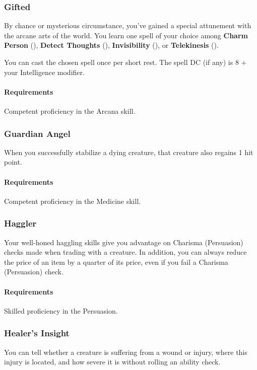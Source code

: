 \subsubsection{Gifted} \label{feat::gifted}
    By chance or mysterious circumstance, you've gained a special attunement with the arcane arts of the world.
    You learn one spell of your choice among \textbf{Charm Person} (\pageref{spell::charmperson}), \textbf{Detect Thoughts} (\pageref{spell::detectthoughts}), \textbf{Invisibility} (\pageref{spell::invisibility}), or \textbf{Telekinesis} (\pageref{spell::telekinesis}).

    You can cast the chosen spell once per short rest.
    The spell DC (if any) is 8 + your Intelligence modifier.
    \paragraph{Requirements} Competent proficiency in the Arcana skill.
\subsubsection{Guardian Angel} \label{feat::guardianangel}
    When you successfully stabilize a dying creature, that creature also regains 1 hit point.
    \paragraph{Requirements} Competent proficiency in the Medicine skill.
\subsubsection{Haggler} \label{feat::haggler}
    Your well-honed haggling skills give you advantage on Charisma (Persuasion) checks made when trading with a creature.
    In addition, you can always reduce the price of an item by a quarter of its price, even if you fail a Charisma (Persuasion) check.
    \paragraph{Requirements} Skilled proficiency in the Persuasion.
\subsubsection{Healer's Insight} \label{feat::healersinsight}
    You can tell whether a creature is suffering from a wound or injury, where this injury is located, and how severe it is without rolling an ability check.
